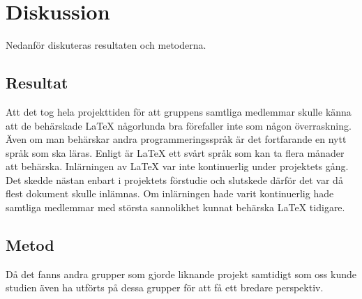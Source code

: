 \section{Diskussion}
Nedanför diskuteras resultaten och metoderna. 
\subsection{Resultat}
Att det tog hela projekttiden för att gruppens samtliga medlemmar skulle känna att de behärskade {\LaTeX} någorlunda bra förefaller inte som någon överraskning. Även om man behärskar andra programmeringsspråk är det fortfarande en nytt språk som ska läras. Enligt \citep{latexandfriends} är {\LaTeX} ett svårt språk som kan ta flera månader att behärska.
Inlärningen av {\LaTeX} var inte kontinuerlig under projektets gång. Det skedde nästan enbart i projektets förstudie och slutskede därför det var då flest dokument skulle inlämnas. Om inlärningen hade varit kontinuerlig hade samtliga medlemmar med största sannolikhet kunnat behärska {\LaTeX} tidigare.
 
\subsection{Metod}
Då det fanns andra grupper som gjorde liknande projekt samtidigt som oss kunde studien även ha utförts på dessa grupper för att få ett bredare perspektiv. 